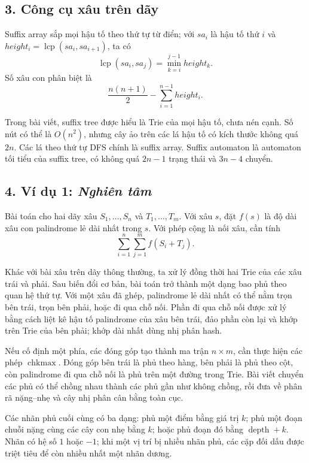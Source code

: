 \documentclass[11pt]{article}
\begin{document}
\subsection*{3. Công cụ xâu trên dãy}

Suffix array sắp mọi hậu tố theo thứ tự từ điển; với \(sa_i\) là hậu tố thứ
\(i\) và \(height_i=\operatorname{lcp}(sa_i,sa_{i+1})\), ta có
\[
  \operatorname{lcp}(sa_i,sa_j)=\min_{k=i}^{j-1} height_k.
\]
Số xâu con phân biệt là
\[
  \frac{n(n+1)}{2}-\sum_{i=1}^{n-1} height_i.
\]

Trong bài viết, suffix tree được hiểu là Trie của mọi hậu tố, chưa nén cạnh.
Số nút có thể là \(O(n^2)\), nhưng cây ảo trên các lá hậu tố có kích thước
không quá \(2n\). Các lá theo thứ tự DFS chính là suffix array. Suffix
automaton là automaton tối tiểu của suffix tree, có không quá \(2n-1\) trạng
thái và \(3n-4\) chuyển.

\subsection*{4. Ví dụ 1: \emph{Nghiên tâm}}

Bài toán cho hai dãy xâu \(S_1,\ldots,S_n\) và \(T_1,\ldots,T_m\). Với xâu
\(s\), đặt \(f(s)\) là độ dài xâu con palindrome lẻ dài nhất trong \(s\). Với
phép cộng là nối xâu, cần tính
\[
  \sum_{i=1}^{n}\sum_{j=1}^{m} f(S_i+T_j).
\]

Khác với bài xâu trên dãy thông thường, ta xử lý đồng thời hai Trie của các
xâu trái và phải. Sau biến đổi cơ bản, bài toán trở thành một dạng bao phủ
theo quan hệ thứ tự. Với một xâu đã ghép, palindrome lẻ dài nhất có thể nằm
trọn bên trái, trọn bên phải, hoặc đi qua chỗ nối. Phần đi qua chỗ nối được
xử lý bằng cách liệt kê hậu tố palindrome của xâu bên trái, đảo phần còn lại
và khớp trên Trie của bên phải; khớp dài nhất dùng nhị phân hash.

Nếu cố định một phía, các đóng góp tạo thành ma trận \(n\times m\), cần thực
hiện các phép \(\operatorname{chkmax}\). Đóng góp bên trái là phủ theo hàng,
bên phải là phủ theo cột, còn palindrome đi qua chỗ nối là phủ trên một đường
trong Trie. Bài viết chuyển các phủ có thể chồng nhau thành các phủ gần như
không chồng, rồi đưa về phân rã nặng--nhẹ và cây nhị phân cân bằng toàn cục.

Các nhãn phủ cuối cùng có ba dạng: phủ một điểm bằng giá trị \(k\); phủ một
đoạn chuỗi nặng cùng các cây con nhẹ bằng \(k\); hoặc phủ đoạn đó bằng
\(\operatorname{depth}+k\). Nhãn có hệ số \(1\) hoặc \(-1\); khi một vị trí bị
nhiều nhãn phủ, các cặp đối dấu được triệt tiêu để còn nhiều nhất một nhãn
dương.
\end{document}
